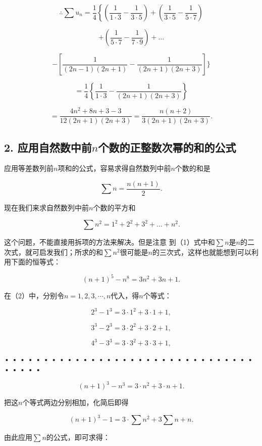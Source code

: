 \[
\therefore \sum u_{n} = \frac{1}{4} \left\{\left(\frac{1}{1 \cdot 3} - \frac{1}{3 \cdot 5}\right) + \left(\frac{1}{3 \cdot 5} - \frac{1}{5 \cdot 7}\right) \right.
\]

\[
+ \left(\frac{1}{5 \cdot 7} - \frac{1}{7 \cdot 9}\right) + \dots
\]

\[
- \left[ \frac{1}{(2 n - 1) (2 n + 1)} - \frac{1}{(2 n + 1) (2 n + 3)} \right] \Bigg \}
\]

\[
= \frac{1}{4} \left\{\frac{1}{1 \cdot 3} - \frac{1}{(2 n + 1) (2 n + 3)} \right\}
\]

\[
= \frac{4 n^{2} + 8 n + 3 - 3}{12 (2 n + 1) (2 n + 3)} = \frac{n (n + 2)}{3 (2 n + 1) (2 n + 3)}.
\]

\subsection{\texorpdfstring{2. 应用自然数中前\(n\)个数的正整数次幂的和的公式}{2. 应用自然数中前n个数的正整数次幂的和的公式}}

应用等差数列前\(n\)项和的公式，容易求得自然数列中前\(n\)个数的和是

\[
\sum n = \frac{n (n + 1)}{2}. \tag {1}
\]

现在我们来求自然数列中前\(n\)个数的平方和

\[
\sum n^{2} = 1^{2} + 2^{2} + 3^{2} + \dots + n^{2}.
\]

这个问题，不能直接用拆项的方法来解决。但是注意
到（1）式中和\(\sum n\)是\(n\)的二次式，就可启发我们；所求的和\(\sum n^2\)很可能是\(n\)的三次式，这样也就能想到可以利用下面的恒等式：

\[
(n + 1)^{5} - n^{8} = 3 n^{2} + 3 n + 1. \tag {2}
\]

在（2）中，分别令\(n = 1, 2, 3, \cdots, n\)代入，得\(n\)个等式：

\[
2^{3} - 1^{3} = 3 \cdot 1^{2} + 3 \cdot 1 + 1,
\]

\[
3^{3} - 2^{3} = 3 \cdot 2^{2} + 3 \cdot 2 + 1,
\]

\[
4^{3} - 3^{3} = 3 \cdot 3^{2} + 3 \cdot 3 + 1,
\]

• • • • • • • • • • • • • • • • • • • • • • • • • • • • • • • • • • • •
•

\[
(n + 1)^{3} - n^{3} = 3 \cdot n^{2} + 3 \cdot n + 1.
\]

把这\(n\)个等式两边分别相加，化简后即得

\[
(n + 1)^{3} - 1 = 3 \cdot \sum n^{2} + 3\sum n+n.
\]

由此应用\(\sum n\)的公式，即可求得：

